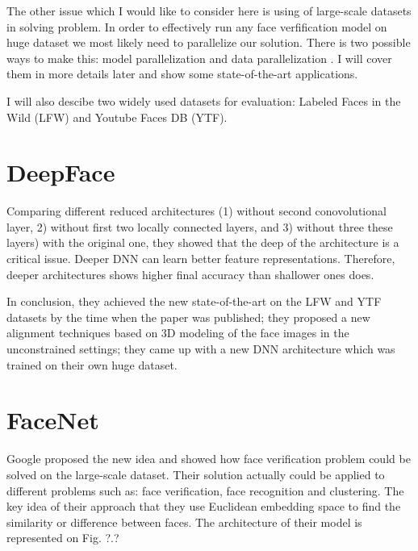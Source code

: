 \documentclass[paper=a4, fontsize=11pt]{scrartcl} %
\numberwithin{equation}{section} %
\numberwithin{figure}{section} %
\numberwithin{table}{section} %
\begin{document}
The other issue which I would like to consider here is using of large-scale datasets in solving problem. In order to effectively run any face verfification model on huge dataset we most likely need to parallelize our solution. There is two possible ways to make this: model parallelization and data parallelization \cite{dean2012large}. I will cover them in more details later and show some state-of-the-art applications. \par


I will also descibe two widely used datasets for evaluation: Labeled Faces in the Wild (LFW) and Youtube Faces DB (YTF).

\section{DeepFace}
Comparing different reduced architectures (1) without second conovolutional layer, 2) without first two locally connected layers, and 3) without three these layers) with the original one, they showed that the deep of the architecture is a critical issue. Deeper DNN can learn better feature representations. Therefore, deeper architectures shows higher final accuracy than shallower ones does. \par
In conclusion, they achieved the new state-of-the-art on the LFW and YTF datasets by the time when the paper was published; they proposed a new alignment techniques based on 3D modeling of the face images in the unconstrained settings; they came up with a new DNN architecture which was trained on their own huge dataset.

\section{FaceNet}

Google proposed the new idea \cite{schroff2015facenet} and showed how face verification problem could be solved on the large-scale dataset. Their solution actually could be applied to different problems such as: face verification, face recognition and clustering. The key idea of their approach that they use Euclidean embedding space to find the similarity or difference between faces. The architecture of their model is represented on Fig. ?.?
\end{document}
